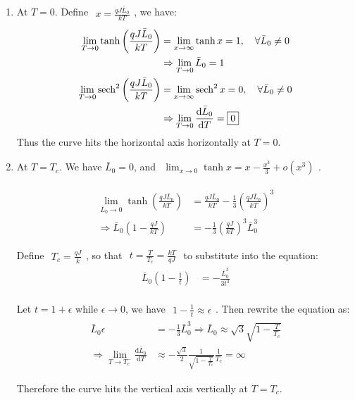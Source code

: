 \documentclass[../../main.tex]{subfiles}
\begin{document}
  \begin{enumerate}
    \item At $T = 0$. Define $\begin{aligned}
      x = \frac{qJ\bar{L}_{0}}{kT}
    \end{aligned}$, we have: 
    \begin{align*}
      \lim_{T\rightarrow 0}\tanh{\left(\frac{qJ\bar{L}_{0}}{kT}\right)} &= \lim_{x\rightarrow \infty}\tanh{x} = 1, \quad\forall \bar{L}_{0}\neq 0\\
      &\Rightarrow  \lim_{T\rightarrow 0}\bar{L}_{0} = 1 \\
      \lim_{T\rightarrow 0}\operatorname{sech}^{2}\left(\frac{qJ\bar{L}_{0}}{kT}\right) &= \lim_{x\rightarrow \infty}\operatorname{sech}^{2}{x} = 0,\quad \forall \bar{L}_{0}\neq 0\\
      &\Rightarrow \lim_{T\rightarrow 0}\frac{\mathrm{d}\bar{L}_{0}}{\mathrm{d}T} = \boxed{0}
    \end{align*}
    Thus the curve hits the horizontal axis horizontally at $T = 0$.
    \item At $T = T_{c}$. We have $\bar{L}_{0} = 0$, and $\begin{aligned}
      \lim_{x\rightarrow 0}\tanh{x} = x - \frac{x^{3}}{3} + o(x^{3})
    \end{aligned}$.

    \begin{align*}
      \lim_{\bar{L}_{0}\rightarrow 0}\tanh{\left(\frac{qJ\bar{L}_{0}}{kT}\right)} &= \frac{qJ\bar{L}_{0}}{kT} - \frac{1}{3}\left(\frac{qJ\bar{L}_{0}}{kT}\right)^{3}\\
      \Rightarrow \bar{L}_{0}\left(1 - \frac{qJ}{kT}\right) &= -\frac{1}{3}\left(\frac{qJ}{kT}\right)^{3}\bar{L}_{0}^{3}
    \end{align*}

    Define $\begin{aligned}
      T_{c} = \frac{qJ}{k}
    \end{aligned}$, so that $\begin{aligned}
      t = \frac{T}{T_{c}} = \frac{kT}{qJ}
    \end{aligned}$ to substitute into the equation:
    \begin{align*}
      \bar{L}_{0}\left(1 - \frac{1}{t}\right) &= -\frac{\bar{L}_{0}^{3}}{3t^{3}}\\
    \end{align*}

    Let $t = 1 + \epsilon$ while $\epsilon\rightarrow 0$, we have $\begin{aligned}
      1 - \frac{1}{t} \approx \epsilon
    \end{aligned}$. Then rewrite the equation as:
    \begin{align*}
      \bar{L}_{0}\epsilon &= -\frac{1}{3}\bar{L}_{0}^{3}\Rightarrow \bar{L}_{0} \approx \sqrt{3}\sqrt{1 - \frac{T}{T_{c}}}\\
      \Rightarrow \lim_{T\rightarrow T_{c}^{-}}\frac{\mathrm{d}\bar{L}_{0}}{\mathrm{d}T} &\approx -\frac{\sqrt{3}}{2}\frac{1}{\sqrt{1 - \frac{T}{T_{c}}}}\frac{1}{T_{c}} = \boxed{\infty}
    \end{align*}

    Therefore the curve hits the vertical axis vertically at $T = T_{c}$.
    
  \end{enumerate}
\end{document}
